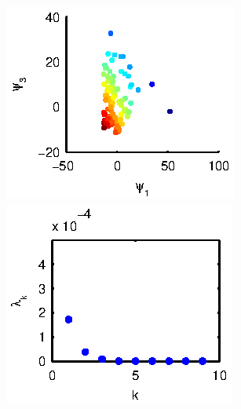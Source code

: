 \begin{figure}[t]
\begin{subfigure}{0.22\textwidth}
\includegraphics[width=\textwidth]{rxn_npoints_embed2}\\
\includegraphics[width=\textwidth]{rxn_npoints_spectrum2}
\caption{}
\label{subfig:rxn_convergence2}
\end{subfigure}
\hfill
\begin{subfigure}{0.22\textwidth}

\end{subfigure}
\end{figure}
